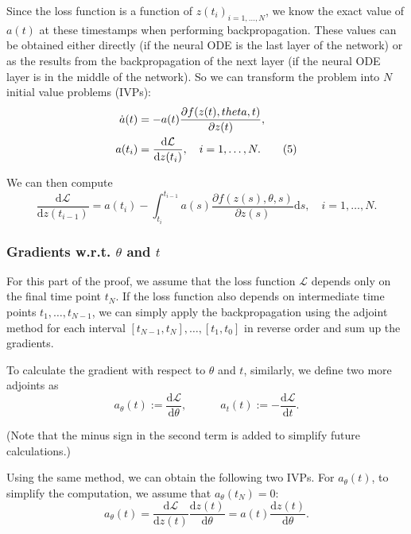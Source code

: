 \documentclass[a4paper,11pt,titlepage]{article}
\theoremstyle{definition}
\theoremstyle{plain}
\theoremstyle{remark}
\begin{document}
Since the loss function is a function of $z(t_i)_{i=1,\dots,N}$, we know the exact value of $a(t)$ at these timestamps when performing backpropagation. These values can be obtained either directly (if the neural ODE is the last layer of the network) or as the results from the backpropagation of the next layer (if the neural ODE layer is in the middle of the network). So we can transform the problem into $N$ initial value problems (IVPs):
\begin{align}{\label{eq5}}
    \dot{a}(t) &= -a(t)\frac{\partial f(z(t),\theta,t)}{\partial z(t)},\notag\\
    a(t_i) &= \frac{\mathrm{d}\mathcal{L}}{\mathrm{d} z(t_i)},\quad i=1,\dots,N. \tag{5}
\end{align}

We can then compute
$$
\frac{\mathrm{d}\mathcal{L}}{\mathrm{d}z(t_{i-1})} =a(t_i)- \int_{t_i}^{t_{i-1}}a(s)\frac{\partial f(z(s),\theta,s)}{\partial z(s)}\mathrm{d}s,\quad i=1,\dots,N.
$$

\subsubsection{Gradients w.r.t. \(\theta\) and \(t\)}

For this part of the proof, we assume that the loss function $\mathcal{L}$ depends only on the final time point $t_N$. If the loss function also depends on intermediate time points $t_1,\dots,t_{N-1}$, we can simply apply the backpropagation using the adjoint method for each interval $[t_{N-1},t_N],\dots,[t_1,t_0]$ in reverse order and sum up the gradients. 

To calculate the gradient with respect to $\theta$ and $t$, similarly, we define two more adjoints as
$$a_{\theta}(t):=\frac{\mathrm{d}\mathcal{L}}{\mathrm{d} \theta},
\quad\quad\quad a_{t}(t):=-\frac{\mathrm{d}\mathcal{L}}{\mathrm{d} t}.$$

(Note that the minus sign in the second term is added to simplify future calculations.)

Using the same method, we can obtain the following two IVPs. For $a_\theta(t)$, to simplify the computation, we assume that $a_\theta(t_N)=0$:
$$
a_{\theta}(t) = \frac{\mathrm{d}\mathcal{L}}{\mathrm{d} z(t)}\frac{\mathrm{d} z(t)}{\mathrm{d}\theta}=a(t)\frac{\mathrm{d} z(t)}{\mathrm{d}\theta}.
$$
\end{document}
